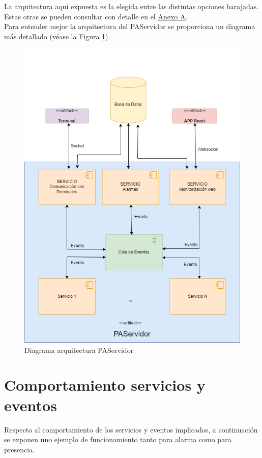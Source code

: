 La arquitectura aquí expuesta es la elegida entre las distintas opciones barajadas. Estas otras se pueden consultar con detalle en el \hyperref[anexo-a]{Anexo A}.\\

Para entender mejor la arquitectura del PAServidor se proporciona un diagrama más detallado (véase la Figura \ref{fig:PAServidor}).

\begin{figure}[H]
    \centering
    \includegraphics[width=12cm]{Imagenes/Arquitectura-PAServidor}
    \caption{Diagrama arquitectura PAServidor}
    \label{fig:PAServidor}
\end{figure}


\section{Comportamiento servicios y eventos}
Respecto al comportamiento de los servicios y eventos implicados, a continuación se exponen uno ejemplo de funcionamiento tanto para alarma como para presencia.\\

